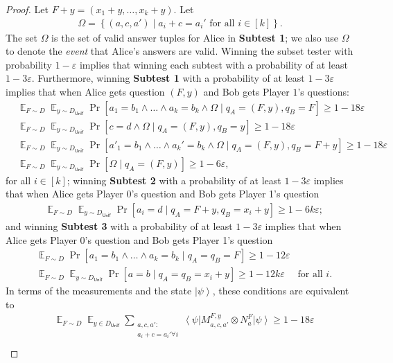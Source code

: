 \documentclass[10pt,a4paper]{article}
\theoremstyle{plain}
\theoremstyle{definition}
\newcommand {\set} [1] {\ensuremath{ \left\lbrace #1 \right\rbrace }}
\newcommand {\bra} [1] {\ensuremath{ \left\langle #1 \right| }}
\newcommand {\ket} [1] {\ensuremath{ \left| #1 \right\rangle }}
\DeclareMathOperator*{\bigE}{\mathbb{E}}
\newcommand{\ep} {\ensuremath{\varepsilon}}
\newcommand{\x}{\otimes}
\newcommand{\1}{\mathbb{1}} %
\newcommand{\Unif}{\mathsf{Unif}}
\begin{document}
\begin{proof}
Let $F+y = (x_1+y, \ldots, x_k+y)$.
Let 
\begin{align*}
\Omega = \set{( a, c ,a') \mid a_i + c = a_i' \text{ for all } i \in [k]}.
\end{align*}
The set $\Omega$ is the set of valid answer tuples for Alice in \textbf{Subtest 1}; we also use $\Omega$ to denote the \emph{event} that Alice's answers are valid.
Winning the subset tester with probability $1 - \ep$ implies that 
winning each subtest with a probability of at least $1 - 3\ep$.
Furthermore,
winning \textbf{Subtest 1} with a probability of at least $1 - 3\ep$ implies that 
when Alice gets question $(F,y)$ and Bob gets Player $1$'s questions:
\begin{align*}
	&\bigE_{F \sim D} \bigE_{y \sim D_{\Unif}} \Pr[a_1 = b_1 \land \ldots \land a_k = b_k \land \Omega \mid q_A = (F,y), q_B = F] \geq 1 - 18\ep \\
	&\bigE_{F \sim D} \bigE_{y \sim D_{\Unif}} \Pr[ c = d \land \Omega \mid q_A = (F,y) ,q_B = y] \geq 1 - 18 \ep \\
	&\bigE_{F \sim D} \bigE_{y \sim D_{\Unif}} \Pr[ a'_1 = b_1 \land \ldots \land a_k' = b_k\land \Omega \mid q_A = (F,y) ,q_B = F+y] \geq 1 - 18 \ep \\
	&\bigE_{F \sim D} \bigE_{y \sim D_{\Unif}} \Pr[ \Omega \mid q_A = (F,y)] \geq 1 - 6\ep,
\end{align*}
for all $i \in [k]$;
winning \textbf{Subtest 2} with a probability of at least $1 - 3\ep$ implies that 
when Alice gets Player 0's question and Bob gets Player 1's question
\begin{align*}
	&\bigE_{F \sim D} \bigE_{y \sim D_{\Unif}} \Pr[ a_i = d \mid q_A = F+y, q_B = x_i + y] \geq 1 - 6k \ep;
\end{align*}
and winning \textbf{Subtest 3} with a probability of at least $1 - 3\ep$ implies that 
when Alice gets Player 0's question and Bob gets Player 1's question
\begin{align*}
	&\bigE_{F \sim D} \Pr[a_1 = b_1 \land \ldots \land a_k = b_k \mid q_A = q_B =F] \geq 1 - 12 \ep \\
	&\bigE_{F \sim D} \bigE_{y \sim D_{\Unif}} \Pr[ a= b \mid q_A = q_B = x_i + y] \geq 1 - 12k \ep \quad \text{ for all } i.
\end{align*}
In terms of the measurements and the state $\ket{\psi}$, these conditions are equivalent to 
\begin{align*}
	&\bigE_{F \sim D} \bigE_{y \in D_{\Unif}} \sum_{\substack{a,c,a': \\ a_i + c = a_i' \forall i}} \bra{\psi} M^{F,y}_{a, c, a'} \x N^F_a \ket{\psi} \geq 1 - 18 \ep \\

\end{align*}
\end{proof}
\end{document}
